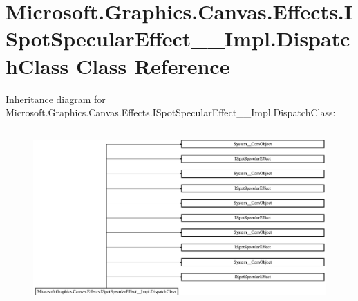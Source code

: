 \hypertarget{class_microsoft_1_1_graphics_1_1_canvas_1_1_effects_1_1_i_spot_specular_effect_____impl_1_1_dispatch_class}{}\section{Microsoft.\+Graphics.\+Canvas.\+Effects.\+I\+Spot\+Specular\+Effect\+\_\+\+\_\+\+Impl.\+Dispatch\+Class Class Reference}
\label{class_microsoft_1_1_graphics_1_1_canvas_1_1_effects_1_1_i_spot_specular_effect_____impl_1_1_dispatch_class}
Inheritance diagram for Microsoft.\+Graphics.\+Canvas.\+Effects.\+I\+Spot\+Specular\+Effect\+\_\+\+\_\+\+Impl.\+Dispatch\+Class\+:\begin{figure}[H]
\begin{center}
\leavevmode
\includegraphics[height=6.784141cm]{class_microsoft_1_1_graphics_1_1_canvas_1_1_effects_1_1_i_spot_specular_effect_____impl_1_1_dispatch_class}
\end{center}
\end{figure}
